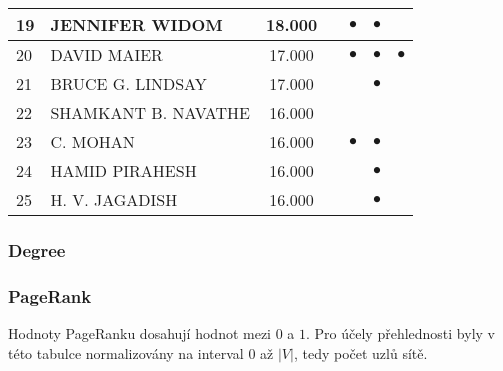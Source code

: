 \documentclass[12pt,titlepage]{report}
\begin{document}
\begin{center}
\begin{tabular}{|l|l|c|c|c|c|c|}
\hline
19 & JENNIFER WIDOM & 18.000       & & $\bullet$ & $\bullet$ &         \\
\hline
20 & DAVID MAIER & 17.000          & & $\bullet$ & $\bullet$ & $\bullet$ \\
\hline
21 & BRUCE G. LINDSAY & 17.000     & &         & $\bullet$ &         \\
\hline
22 & SHAMKANT B. NAVATHE & 16.000  & &         &         &         \\
\hline
23 & C. MOHAN & 16.000             & & $\bullet$ & $\bullet$ &         \\
\hline
24 & HAMID PIRAHESH & 16.000       & &         & $\bullet$ &         \\
\hline
25 & H. V. JAGADISH & 16.000       & &         & $\bullet$ &         \\
\hline
\end{tabular}
\end{center}

\subsubsection{Degree}
\subsubsection{PageRank}
Hodnoty PageRanku dosahují hodnot mezi $0$ a $1$. Pro účely přehlednosti byly v
této tabulce normalizovány na interval $0$ až $|V|$, tedy počet uzlů sítě.
\end{document}
